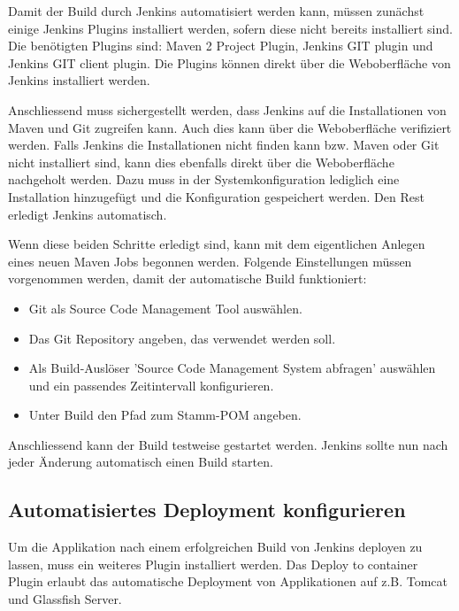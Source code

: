 Damit der Build durch Jenkins automatisiert werden kann, müssen zunächst einige Jenkins Plugins installiert werden, sofern diese nicht bereits installiert sind. Die benötigten Plugins sind: Maven 2 Project Plugin, Jenkins GIT plugin und Jenkins GIT client plugin. Die Plugins können direkt über die Weboberfläche von Jenkins installiert werden.

Anschliessend muss sichergestellt werden, dass Jenkins auf die Installationen von Maven und Git zugreifen kann. Auch dies kann über die Weboberfläche verifiziert werden. Falls Jenkins die Installationen nicht finden kann bzw. Maven oder Git nicht installiert sind, kann dies ebenfalls direkt über die Weboberfläche nachgeholt werden. Dazu muss in der Systemkonfiguration lediglich eine Installation hinzugefügt und die Konfiguration gespeichert werden. Den Rest erledigt Jenkins automatisch.

Wenn diese beiden Schritte erledigt sind, kann mit dem eigentlichen Anlegen eines neuen Maven Jobs begonnen werden. Folgende Einstellungen müssen vorgenommen werden, damit der automatische Build funktioniert:
\begin{itemize}
	\item Git als Source Code Management Tool auswählen.
	\item Das Git Repository angeben, das verwendet werden soll.
	\item Als Build-Auslöser 'Source Code Management System abfragen' auswählen und ein passendes Zeitintervall konfigurieren.
	\item Unter Build den Pfad zum Stamm-POM angeben.
\end{itemize}

Anschliessend kann der Build testweise gestartet werden. Jenkins sollte nun nach jeder Änderung automatisch einen Build starten.


\subsection{Automatisiertes Deployment konfigurieren}

Um die Applikation nach einem erfolgreichen Build von Jenkins deployen zu lassen, muss ein weiteres Plugin installiert werden. Das Deploy to container Plugin erlaubt das automatische Deployment von Applikationen auf z.B. Tomcat und Glassfish Server.

